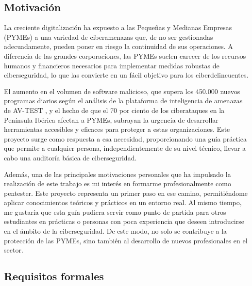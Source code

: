 \documentclass[a4paper, 11pt]{article}
\begin{document}
\par\vspace{0.5cm}

\subsection{Motivación}
\par\vspace{0.5cm}

La creciente digitalización ha expuesto a las Pequeñas y Medianas Empresas (PYMEs) a una variedad de ciberamenazas que, de no ser gestionadas adecuadamente, 
pueden poner en riesgo la continuidad de sus operaciones. A diferencia de las grandes corporaciones, las PYMEs suelen carecer de los recursos humanos y financieros 
necesarios para implementar medidas robustas de ciberseguridad, lo que las convierte en un fácil objetivo para los ciberdelincuentes.
\par\vspace{0.5cm}
El aumento en el volumen de software malicioso, que supera los 450.000 nuevos programas diarios según el análisis de la plataforma de inteligencia de amenazas de AV-TEST \cite{avtest}, y el hecho de que el 70 
por ciento de los ciberataques en la Península Ibérica afectan a PYMEs, subrayan la urgencia de desarrollar herramientas accesibles y eficaces para proteger a estas organizaciones. 
Este proyecto surge como respuesta a esa necesidad, proporcionando una guía práctica que permite a cualquier persona, independientemente de su nivel técnico, llevar a cabo una auditoría 
básica de ciberseguridad.
\par\vspace{0.5cm}
Además, una de las principales motivaciones personales que ha impulsado la realización de este trabajo es mi interés en formarme profesionalmente como pentester. 
Este proyecto representa un primer paso en ese camino, permitiéndome aplicar conocimientos teóricos y prácticos en un entorno real. Al mismo tiempo, me gustaría que esta guía 
pudiera servir como punto de partida para otros estudiantes en prácticas o personas con poca experiencia que deseen introducirse en el ámbito de la ciberseguridad. 
De este modo, no solo se contribuye a la protección de las PYMEs, sino también al desarrollo de nuevos profesionales en el sector.
\par\vspace{0.5cm}


\subsection{Requisitos formales}
\par\vspace{0.5cm}
\end{document}
